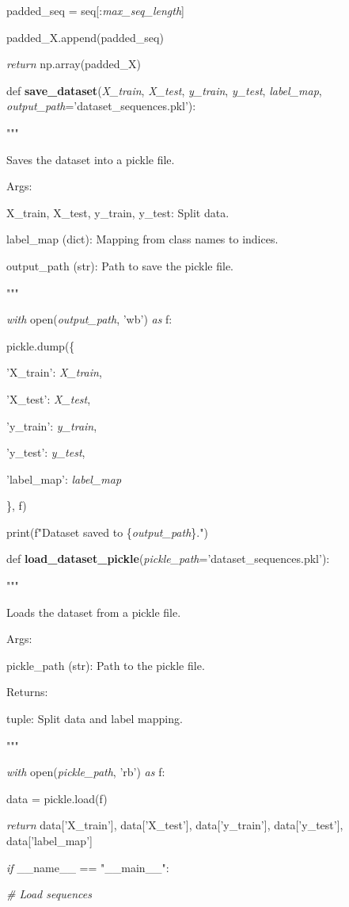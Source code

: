\documentclass[
]{article}
\begin{document}
padded\_seq = seq{[}:\emph{max\_seq\_length}{]}

padded\_X.append(padded\_seq)

\emph{return} np.array(padded\_X)

def \textbf{save\_dataset}(\emph{X\_train}, \emph{X\_test}, \emph{y\_train}, \emph{y\_test}, \emph{label\_map}, \emph{output\_path}='dataset\_sequences.pkl'):

"""

Saves the dataset into a pickle file.

Args:

X\_train, X\_test, y\_train, y\_test: Split data.

label\_map (dict): Mapping from class names to indices.

output\_path (str): Path to save the pickle file.

"""

\emph{with} open(\emph{output\_path}, 'wb') \emph{as} f:

pickle.dump(\{

'X\_train': \emph{X\_train},

'X\_test': \emph{X\_test},

'y\_train': \emph{y\_train},

'y\_test': \emph{y\_test},

'label\_map': \emph{label\_map}

\}, f)

print(f"Dataset saved to \{\emph{output\_path}\}.")

def \textbf{load\_dataset\_pickle}(\emph{pickle\_path}='dataset\_sequences.pkl'):

"""

Loads the dataset from a pickle file.

Args:

pickle\_path (str): Path to the pickle file.

Returns:

tuple: Split data and label mapping.

"""

\emph{with} open(\emph{pickle\_path}, 'rb') \emph{as} f:

data = pickle.load(f)

\emph{return} data{[}'X\_train'{]}, data{[}'X\_test'{]}, data{[}'y\_train'{]}, data{[}'y\_test'{]}, data{[}'label\_map'{]}

\emph{if} \_\_name\_\_ == "\_\_main\_\_":

\emph{\# Load sequences}
\end{document}
